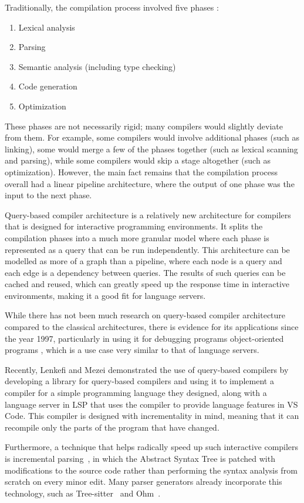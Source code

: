 Traditionally, the compilation process involved five phases \cite{dragon-book}:
\begin{enumerate}
  \item Lexical analysis
  \item Parsing
  \item Semantic analysis (including type checking)
  \item Code generation
  \item Optimization
\end{enumerate}

These phases are not necessarily rigid; many compilers would slightly deviate from them.
For example, some compilers would involve additional phases (such as linking),
some would merge a few of the phases together (such as lexical scanning and parsing),
while some compilers would skip a stage altogether (such as optimization).
However, the main fact remains that the compilation process overall had a linear pipeline
architecture, where the output of one phase was the input to the next phase.

Query-based compiler architecture \cite{ollef-rock} is a relatively new architecture for
compilers that is designed for interactive programming environments.
It splits the compilation phases into a much more granular model where each phase is
represented as a query that can be run independently.
This architecture can be modelled as more of a graph than a pipeline, where each node
is a query and each edge is a dependency between queries.
The results of such queries can be cached and reused, which can greatly speed up the
response time in interactive environments, making it a good fit for language servers.

While there has not been much research on query-based compiler architecture compared
to the classical architectures, there is evidence for its applications since the year 1997,
particularly in using it for debugging programs object-oriented programs \cite{Lencevicius1997},
which is a use case very similar to that of language servers.

Recently, Lenkefi and Mezei \cite{icsoft22} demonstrated the use of query-based compilers
by developing a library for query-based compilers and using it to implement a compiler
for a simple programming language they designed, along with a language server in LSP
that uses the compiler to provide language features in VS Code.
This compiler is designed with incrementality in mind, meaning that it can recompile
only the parts of the program that have changed.

Furthermore, a technique that helps radically speed up such interactive compilers
is incremental parsing~\cite{Ghezzi1979}\cite{diekmann2019editing}\cite{Wagner1998},
in which the Abstract Syntax Tree is patched with modifications to the source code
rather than performing the syntax analysis from scratch on every minor edit.
Many parser generators already incorporate this technology, such as
Tree-sitter~\cite{tree-sitter} and Ohm~\cite{Dubroy2017}.
